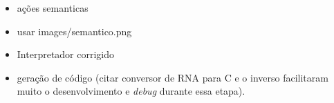 
\begin{itemize}
	\item ações semanticas
	\item usar images/semantico.png
	\item Interpretador corrigido
	\item geração de código (citar conversor de RNA para C e o inverso facilitaram muito o desenvolvimento e \emph{debug} durante essa etapa).
\end{itemize}
